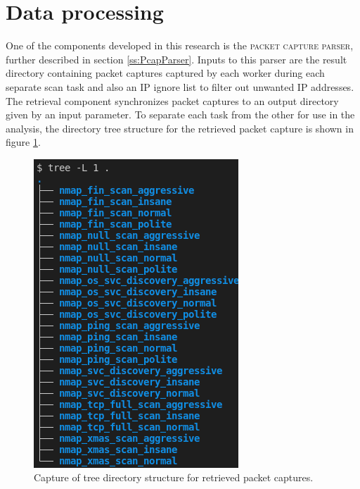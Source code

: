 \section{Data processing}
\label{s:DataGAProcessing}

One of the components developed in this research is the \textsc{packet capture parser}, further described in section \ref{ss:PcapParser}.
Inputs to this parser are the result directory containing packet captures captured by each worker during each separate scan task and also an IP ignore list to filter out unwanted IP addresses. The retrieval component synchronizes packet captures to an output directory given by an input parameter. To separate each task from the other for use in the analysis, the directory tree structure for the retrieved packet capture is shown in figure \ref{fig:LabTree}.

\begin{figure}[htbp]
\centerline{\includegraphics[scale=0.50]{images/lab/treepcap.png}}
\caption{Capture of tree directory structure for retrieved packet captures.}
\label{fig:LabTree}
\end{figure}

